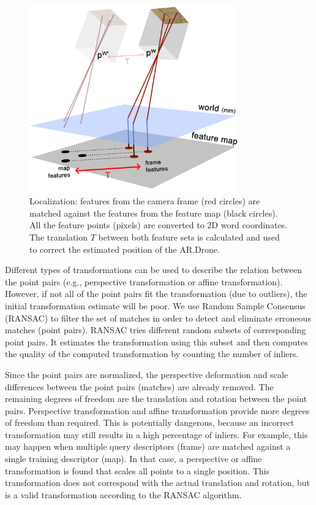 \begin{figure}[htb]
\centering
\includegraphics[width=9cm]{images/localization1.png}
\caption{Localization: features from the camera frame (red circles) are matched against the features from the feature map (black circles). All the feature points (pixels) are converted to 2D word coordinates. The translation $T$ between both feature sets is calculated and used to correct the estimated position of the AR.Drone.}
\label{fig:localization1}
\end{figure}

Different types of transformations can be used to describe the relation between the point pairs (e.g., perspective transformation or affine transformation).
However, if not all of the point pairs fit the transformation (due to outliers), the initial transformation estimate will be poor.
We use Random Sample Consensus (RANSAC) \cite{fischler1981random} to filter the set of matches in order to detect and eliminate erroneous matches (point pairs).
RANSAC tries different random subsets of corresponding point pairs.
It estimates the transformation using this subset and then computes the quality of the computed transformation by counting the number of inliers.

Since the point pairs are normalized,
the perspective deformation and scale differences between the point pairs (matches) are already removed.
The remaining degrees of freedom are the translation and rotation between the point pairs. 
Perspective transformation and affine transformation provide more degrees of freedom than required.
This is potentially dangerous, because an incorrect transformation may still results in a high percentage of inliers.
For example, this may happen when multiple query descriptors (frame) are matched against a single training descriptor (map).
In that case, a perspective or affine transformation is found that scales all points to a single position.
This transformation does not correspond with the actual translation and rotation, but is a valid transformation according to the RANSAC algorithm.

